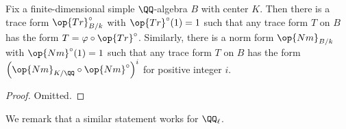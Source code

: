 \documentclass[../notes.tex]{subfiles}
\begin{document}
\begin{proposition} \label{prop:classify-norm-trace-form}
	Fix a finite-dimensional simple $\QQ$-algebra $B$ with center $K$. Then there is a trace form $\op{Tr}_{B/k}^\circ$ with $\op{Tr}^\circ(1)=1$ such that any trace form $T$ on $B$ has the form $T=\varphi\circ\op{Tr}^\circ$. Similarly, there is a norm form $\op{Nm}_{B/k}$ with $\op{Nm}^\circ(1)=1$ such that any trace form $T$ on $B$ has the form $\left({\op{Nm}_{K/\QQ}}\circ\op{Nm}^\circ\right)^i$ for positive integer $i$.
\end{proposition}
\begin{proof}
	Omitted.
\end{proof}
We remark that a similar statement works for $\QQ_\ell$.
\end{document}
